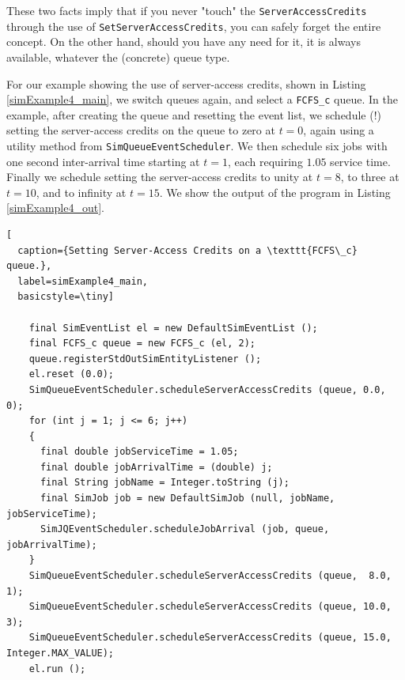\documentclass[12pt]{book}
\begin{document}
These two facts imply that
  if you never "touch"
  the \lstinline|ServerAccessCredits|
  through the use of
  \lstinline|SetServerAccessCredits|,
  you can safely forget the entire concept.
On the other hand,
  should you have any need for it,
  it is always available,
  whatever the (concrete) queue type.

For our example showing the use of server-access credits,
  shown in Listing \ref{simExample4_main},
  we switch queues again,
  and select a \lstinline|FCFS_c| queue.
In the example, after creating the queue
  and resetting the event list,
  we schedule (!) setting the server-access credits
  on the queue to zero at $t=0$,
  again using a utility method
  from \lstinline|SimQueueEventScheduler|.
We then schedule six jobs
  with one second inter-arrival time
  starting at $t=1$,
  each requiring $1.05$ service time.
Finally we schedule setting the server-access credits
  to unity at $t=8$,
  to three at $t=10$,
  and to infinity at $t=15$.
We show the output of the program in
  Listing \ref{simExample4_out}.

\begin{lstfloat}
\begin{lstlisting}[
  caption={Setting Server-Access Credits on a \texttt{FCFS\_c} queue.},
  label=simExample4_main,
  basicstyle=\tiny]

    final SimEventList el = new DefaultSimEventList ();
    final FCFS_c queue = new FCFS_c (el, 2);
    queue.registerStdOutSimEntityListener ();
    el.reset (0.0);
    SimQueueEventScheduler.scheduleServerAccessCredits (queue, 0.0, 0);
    for (int j = 1; j <= 6; j++)
    {
      final double jobServiceTime = 1.05;
      final double jobArrivalTime = (double) j;
      final String jobName = Integer.toString (j);
      final SimJob job = new DefaultSimJob (null, jobName, jobServiceTime);
      SimJQEventScheduler.scheduleJobArrival (job, queue, jobArrivalTime);
    }
    SimQueueEventScheduler.scheduleServerAccessCredits (queue,  8.0, 1);
    SimQueueEventScheduler.scheduleServerAccessCredits (queue, 10.0, 3);
    SimQueueEventScheduler.scheduleServerAccessCredits (queue, 15.0, Integer.MAX_VALUE);
    el.run ();

\end{lstlisting}
\end{lstfloat}
  
\end{document}

